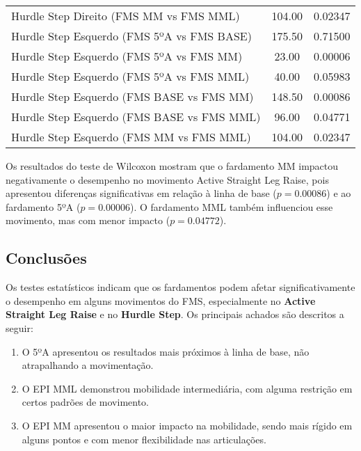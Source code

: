 \begin{table}[H]
\begin{tabular}{lcc}
                Hurdle Step Direito (FMS MM vs FMS MML) & 104.00 & 0.02347 \\
                Hurdle Step Esquerdo (FMS 5ºA vs FMS BASE) & 175.50 & 0.71500 \\
                Hurdle Step Esquerdo (FMS 5ºA vs FMS MM) & 23.00 & 0.00006 \\
                Hurdle Step Esquerdo (FMS 5ºA vs FMS MML) & 40.00 & 0.05983 \\
                Hurdle Step Esquerdo (FMS BASE vs FMS MM) & 148.50 & 0.00086 \\
                Hurdle Step Esquerdo (FMS BASE vs FMS MML) & 96.00 & 0.04771 \\
                Hurdle Step Esquerdo (FMS MM vs FMS MML) & 104.00 & 0.02347 \\
                \hline
            \end{tabular}
            \end{table}

        Os resultados do teste de Wilcoxon mostram que o fardamento \acrlong{MM} impactou negativamente o desempenho no movimento Active Straight Leg Raise, pois apresentou diferenças significativas em relação à linha de base ($p = 0.00086$) e ao fardamento 5ºA ($p = 0.00006$). O fardamento \acrlong{MML} também influenciou esse movimento, mas com menor impacto ($p = 0.04772$).

    \subsection{Conclusões}
        Os testes estatísticos indicam que os fardamentos podem afetar significativamente o desempenho 
        em alguns movimentos do \acrshort{FMS}, especialmente no \textbf{Active Straight Leg Raise} e no \textbf{Hurdle 
        Step}. Os principais achados são descritos a seguir:
        
        \begin{enumerate}[label=\Roman*.] %
            \item O 5ºA apresentou os resultados mais próximos à linha de base, não atrapalhando a 
            movimentação.
            \item O \acrshort{EPI} \acrlong{MML} demonstrou mobilidade intermediária, com alguma
            restrição em certos padrões de movimento.
            \item O \acrshort{EPI} \acrlong{MM} apresentou o maior impacto na mobilidade, sendo 
            mais rígido em alguns pontos e com menor flexibilidade nas articulações.
            \end{enumerate}

